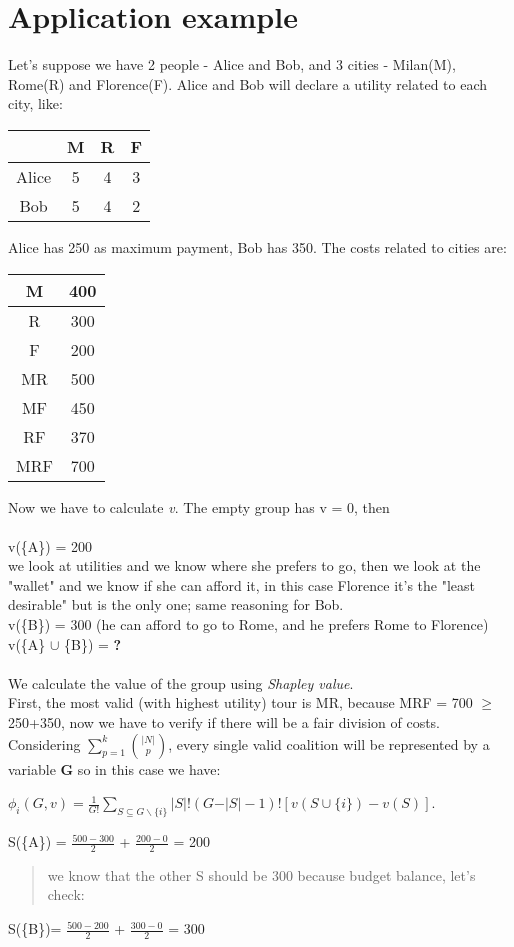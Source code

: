 \documentclass{article}
\begin{document}
\section{Application example}
\Large{
Let's suppose we have 2 people - Alice and Bob, and 3 cities - Milan(M), Rome(R) and Florence(F). Alice and Bob will declare a utility related to each city, like:
\begin{center}
\begin{tabular}{ |c|c|c|c| } 
 \hline
  & M & R & F \\ 
 \hline
 Alice & 5 & 4 & 3\\ 
 \hline
 Bob & 5 & 4 & 2\\ 
 \hline
\end{tabular}
\end{center}
Alice has 250 as maximum payment, Bob has 350. The costs related to cities are:
\begin{center}
\begin{tabular}{ |c|c| } 
 \hline
 M & 400 \\ 
 \hline
 R & 300\\ 
 \hline
 F & 200\\ 
 \hline
 MR & 500\\ 
 \hline
 MF & 450\\ 
 \hline
 RF & 370\\ 
 \hline
 MRF & 700\\ 
 \hline
\end{tabular}
\end{center}
Now we have to calculate \textit{v}. The empty group has v = 0, then \\\\
v(\{A\}) = 200\\
we look at utilities and we know where she prefers to go, then we look at the "wallet" and we know if she can afford it, in this case Florence it's the "least desirable" but is the only one; same reasoning for Bob.\\
v(\{B\}) = 300 (he can afford to go to Rome, and he prefers Rome to Florence)\\
v(\{A\} $\cup$ \{B\}) = \textbf{?} \\\\
We calculate the value of the group using \textit{Shapley value}.\\
First, the most valid (with highest utility) tour is MR, because MRF = 700 $\ge$ 250+350, now we have to verify if there will be a fair division of costs.\\
Considering $\displaystyle\sum_{p=1}^k \binom {\vert N \vert} {p}$, every single valid coalition will be represented by a variable \textbf{G} so in this case we have:
\begin{center}
   \normalsize{
        $\phi_i(G,v) = \frac{1}{G!} \displaystyle \sum_{S \subseteq G \backslash \{i\}} \vert S \vert!(G -  \vert S \vert - 1)! [v(S \cup \{i\}) - v(S)]$.
    }
\end{center}
S(\{A\}) = $\frac {500 - 300} {2}$ + $\frac {200 - 0} {2}$  = 200
\begin{quote}
    we know that the other S should be 300 because budget balance, let's check:
\end{quote}
S(\{B\})= $\frac {500 - 200} {2}$ + $\frac {300 - 0} {2}$ = 300
}
\end{document}
